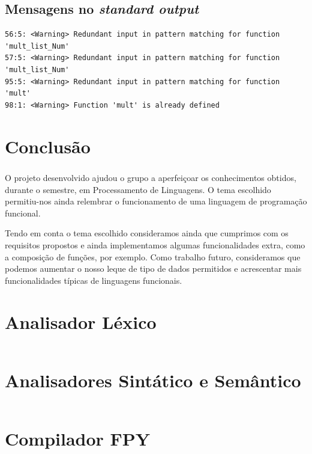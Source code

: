 \documentclass[11pt,a4paper]{report}
\begin{document}
\section*{Mensagens no \textit{standard output}}

\begin{verbatim}
56:5: <Warning> Redundant input in pattern matching for function 'mult_list_Num'
57:5: <Warning> Redundant input in pattern matching for function 'mult_list_Num'
95:5: <Warning> Redundant input in pattern matching for function 'mult'
98:1: <Warning> Function 'mult' is already defined
\end{verbatim}

\chapter{Conclusão} \label{concl}
\paragraph*{}
O projeto desenvolvido ajudou o grupo a aperfeiçoar os conhecimentos obtidos, durante o semestre, em Processamento de Linguagens. O tema escolhido permitiu-nos ainda relembrar o funcionamento de uma linguagem de programação funcional.

Tendo em conta o tema escolhido consideramos ainda que cumprimos com os requisitos propostos e ainda implementamos algumas funcionalidades extra, como a composição de funções, por exemplo. Como trabalho futuro, consideramos que podemos aumentar o nosso leque de tipo de dados permitidos e acrescentar mais funcionalidades típicas de linguagens funcionais.

\appendix

\chapter{Analisador Léxico}
\label{appendix:lexer}
\inputminted[linenos,xleftmargin=16pt, breaklines=true, breakanywhere=true]{Python}{Código/lexer.py}

\chapter{Analisadores Sintático e Semântico}
\label{appendix:parserGrammar}
\inputminted[linenos,xleftmargin=16pt, breaklines=true, breakanywhere=true]{Python}{Código/parserGrammar.py}

\chapter{Compilador FPY}
\label{appendix:fpyCompiler}
\inputminted[linenos,xleftmargin=16pt, breaklines=true, breakanywhere=true]{Python}{Código/fpyCompiler.py}
\end{document}
